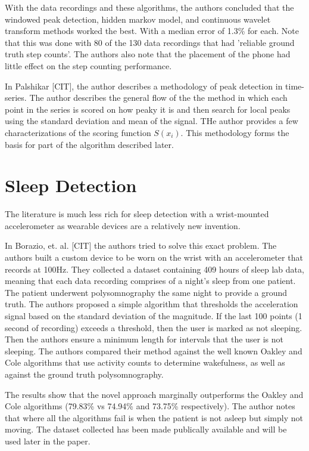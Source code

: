                 With the data recordings and these algorithms, the authors concluded that the windowed peak detection, hidden markov model, and continuous wavelet transform methods worked the best. With a median error of 1.3\% for each. Note that this was done with 80 of the 130 data recordings that had 'reliable ground truth step counts'. The authors also note that the placement of the phone had little effect on the step counting performance. 

                In Palshikar [CIT], the author describes a methodology of peak detection in time-series. The author describes the general flow of the the method in which each point in the series is scored on how peaky it is and then search for local peaks using the standard deviation and mean of the signal. THe author provides a few characterizations of the scoring function $S(x_i)$. This methodology forms the basis for part of the algorithm described later.

        \section{Sleep Detection}

            The literature is much less rich for sleep detection with a wrist-mounted accelerometer as wearable devices are a relatively new invention. 

            In Borazio, et. al. [CIT] the authors tried to solve this exact problem. The authors built a custom device to be worn on the wrist with an accelerometer that records at 100Hz. They collected a dataset containing 409 hours of sleep lab data, meaning that each data recording comprises of a night's sleep from one patient. The patient underwent polysomnography the same night to provide a ground truth. The authors proposed a simple algorithm that thresholds the acceleration signal based on the standard deviation of the magnitude. If the last 100 points (1 second of recording) exceeds a threshold, then the user is marked as not sleeping. Then the authors ensure a minimum length for intervals that the user is not sleeping. The authors compared their method against the well known Oakley and Cole algorithms that use activity counts to determine wakefulness, as well as against the ground truth polysomnography. 

            The results show that the novel approach marginally outperforms the Oakley and Cole algorithms (79.83\% vs 74.94\% and 73.75\% respectively). The author notes that where all the algorithms fail is when the patient is not asleep but simply not moving. The dataset collected has been made publically available and will be used later in the paper. 

